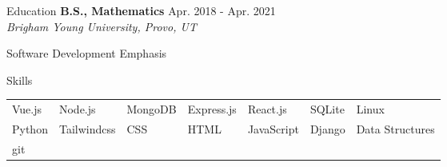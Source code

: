\documentclass{resume} %
\begin{document}
\begin{rSection}{Education}
{\bf B.S., Mathematics }\hfill {Apr. 2018 - Apr. 2021} \\
\textit{Brigham Young University, Provo, UT}
    \begin{compactitem}
        \item Software Development Emphasis
    \end{compactitem}
\end{rSection}

\begin{rSection}{Skills}
        \begin{tabular}{ l l l l l l l }
            Vue.js & Node.js     & MongoDB  & Express.js & React.js   & SQLite   &  Linux\\  
            Python & Tailwindcss &  CSS & HTML & JavaScript &  Django & Data Structures \\
            git 
        \end{tabular}
\end{rSection}
\end{document}
